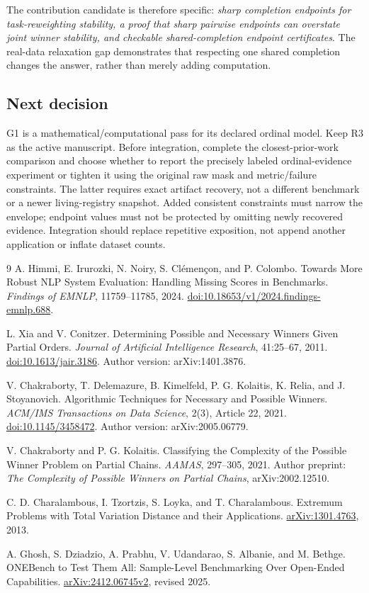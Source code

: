 \documentclass[11pt,a4paper]{article}
\begin{document}
The contribution candidate is therefore specific: \emph{sharp completion
endpoints for task-reweighting stability, a proof that sharp pairwise endpoints
can overstate joint winner stability, and checkable shared-completion endpoint
certificates}. The real-data relaxation gap demonstrates that respecting one
shared completion changes the answer, rather than merely adding computation.

\subsection*{Next decision}
G1 is a mathematical/computational pass for its declared ordinal model. Keep R3
as the active manuscript. Before integration, complete the closest-prior-work
comparison and choose whether to report the precisely labeled ordinal-evidence
experiment or tighten it using the original raw mask and metric/failure
constraints. The latter requires exact artifact recovery, not a different
benchmark or a newer living-registry snapshot. Added consistent constraints
must narrow the envelope; endpoint values must not be protected by omitting
newly recovered evidence. Integration should replace repetitive exposition,
not append another application or inflate dataset counts.

\newpage
\begin{thebibliography}{9}
 A. Himmi, E. Irurozki, N. Noiry, S. Cl\'emen\c{c}on, and P. Colombo.
Towards More Robust NLP System Evaluation: Handling Missing Scores in Benchmarks.
\emph{Findings of EMNLP}, 11759--11785, 2024.
\href{https://doi.org/10.18653/v1/2024.findings-emnlp.688}{doi:10.18653/v1/2024.findings-emnlp.688}.

 L. Xia and V. Conitzer. Determining Possible and Necessary Winners
Given Partial Orders. \emph{Journal of Artificial Intelligence Research}, 41:25--67, 2011.
\href{https://doi.org/10.1613/jair.3186}{doi:10.1613/jair.3186}.
Author version: arXiv:1401.3876.

 V. Chakraborty, T. Delemazure, B. Kimelfeld, P. G. Kolaitis,
K. Relia, and J. Stoyanovich. Algorithmic Techniques for Necessary and Possible
Winners. \emph{ACM/IMS Transactions on Data Science}, 2(3), Article 22, 2021.
\href{https://doi.org/10.1145/3458472}{doi:10.1145/3458472}.
Author version: arXiv:2005.06779.

 V. Chakraborty and P. G. Kolaitis. Classifying the Complexity of
the Possible Winner Problem on Partial Chains. \emph{AAMAS}, 297--305, 2021.
Author preprint: \emph{The Complexity of Possible Winners on Partial Chains},
arXiv:2002.12510.

 C. D. Charalambous, I. Tzortzis, S. Loyka, and T. Charalambous.
Extremum Problems with Total Variation Distance and their Applications.
\href{https://arxiv.org/abs/1301.4763}{arXiv:1301.4763}, 2013.

 A. Ghosh, S. Dziadzio, A. Prabhu, V. Udandarao, S. Albanie,
and M. Bethge. ONEBench to Test Them All: Sample-Level Benchmarking Over Open-Ended
Capabilities. \href{https://arxiv.org/abs/2412.06745}{arXiv:2412.06745v2}, revised 2025.
\end{thebibliography}
\end{document}
